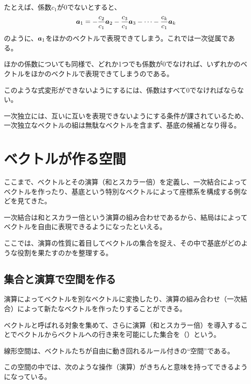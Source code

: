 \documentclass[../imaging-math]{subfiles}
\begin{document}
たとえば、係数$c_1$が$0$でないとすると、
\begin{equation*}
  \vb*{a}_1 = -\frac{c_2}{c_1} \vb*{a}_2 - \frac{c_3}{c_1} \vb*{a}_3 - \cdots - \frac{c_k}{c_1} \vb*{a}_{k}
\end{equation*}
のように、$\vb*{a}_1$をほかのベクトルで表現できてしまう。これでは一次従属である。

ほかの係数についても同様で、どれか1つでも係数が$0$でなければ、いずれかのベクトルをほかのベクトルで表現できてしまうのである。

このような式変形ができないようにするには、係数はすべて$0$でなければならない。

\br

一次独立には、互いに互いを表現できないようにする条件が課されているため、一次独立なベクトルの組は無駄なベクトルを含まず、基底の候補となり得る。

\section{ベクトルが作る空間}

ここまで、ベクトルとその演算（和とスカラー倍）を定義し、一次結合によってベクトルを作ったり、基底という特別なベクトルによって座標系を構成する例などを見てきた。

一次結合は和とスカラー倍という演算の組み合わせであるから、結局はによってベクトルを自由に表現できるようになったといえる。

\br

ここでは、演算の性質に着目してベクトルの集合を捉え、その中で基底がどのような役割を果たすのかを整理する。

\subsection{集合と演算で空間を作る}

演算によってベクトルを別なベクトルに変換したり、演算の組み合わせ（一次結合）によって新たなベクトルを作ったりすることができる。

\br

ベクトルと呼ばれる対象を集めて、さらに演算（和とスカラー倍）を導入することでベクトルからベクトルへの行き来を可能にした集合を（）という。

\br

線形空間は、ベクトルたちが自由に動き回れるルール付きの“空間”である。

この空間の中では、次のような操作（演算）がきちんと意味を持ってできるようになっている。
\end{document}
